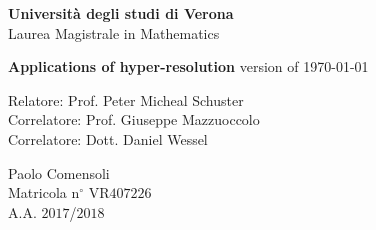 {
\thispagestyle{empty}

\begin{center}
{\Large \textbf{Universit\`a degli studi di Verona\\}}
{\Large  Laurea Magistrale in Mathematics}
\end{center}

\vskip5cm


\begin{center}
{\huge \textbf{Applications of hyper-resolution}}
{\small{version of \today}}
\end{center}


{\large
\vskip2.5cm\noindent Relatore:  Prof. Peter Micheal Schuster\\
Correlatore: Prof. Giuseppe Mazzuoccolo\\
Correlatore: Dott. Daniel Wessel\\
}

\vskip3cm
\hskip9cm\parbox[t]{7cm}
{\large 
Paolo Comensoli\\
Matricola n$^\circ$ VR$407226$\\
A.A. $2017$/$2018$\\
}

\newpage
\newpage
\thispagestyle{empty}
\clearpage
}

